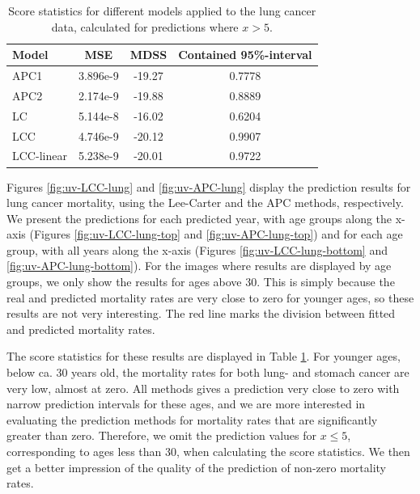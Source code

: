 \begin{table}[h!]
    \begin{center}
        \begin{tabular}{l |c c c }
            Model & MSE &   MDSS & Contained 95\%-interval\\
            \hline
            APC1    & 3.896e-9 & -19.27    & 0.7778 \\
            APC2    & 2.174e-9 & -19.88    & 0.8889 \\
            LC      & 5.144e-8 & -16.02    & 0.6204 \\
            LCC     & 4.746e-9 & -20.12    & 0.9907 \\
            LCC-linear      & 5.238e-9 & -20.01    & 0.9722 \\
        \end{tabular}
        \caption{Score statistics for different models applied to the lung cancer data, calculated for predictions where $x > 5$.}\label{tbl:uv-lung-5}
    \end{center}
\end{table}

\newpar Figures \ref{fig:uv-LCC-lung} and \ref{fig:uv-APC-lung} display the prediction results for lung cancer mortality, using the Lee-Carter and the APC methods, respectively. We present the predictions for each predicted year, with age groups along the x-axis (Figures \ref{fig:uv-LCC-lung-top} and \ref{fig:uv-APC-lung-top}) and for each age group, with all years along the x-axis (Figures \ref{fig:uv-LCC-lung-bottom} and \ref{fig:uv-APC-lung-bottom}). For the images where results are displayed by age groups, we only show the results for ages above 30. This is simply because the real and predicted mortality rates are very close to zero for younger ages, so these results are not very interesting. The red line marks the division between fitted and predicted mortality rates. 

\newpar The score statistics for these results are displayed in Table \ref{tbl:uv-lung-5}. For younger ages, below ca. 30 years old, the mortality rates for both lung- and stomach cancer are very low, almost at zero. All methods gives a prediction very close to zero with narrow prediction intervals for these ages, and we are more interested in evaluating the prediction methods for mortality rates that are significantly greater than zero. Therefore, we omit the prediction values for $x \leq 5$, corresponding to ages less than 30, when calculating the score statistics. We then get a better impression of the quality of the prediction of non-zero mortality rates. 


